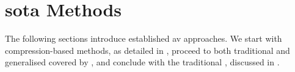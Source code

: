 \section{\Acl{sota} Methods}
\label{sec:sota_methods}

The following sections introduce established \ac{av} approaches.
We start with compression-based methods, as detailed in , proceed to both traditional and generalised \unmasking{} covered by , and conclude with the traditional \impAppr{}, discussed in .




  
